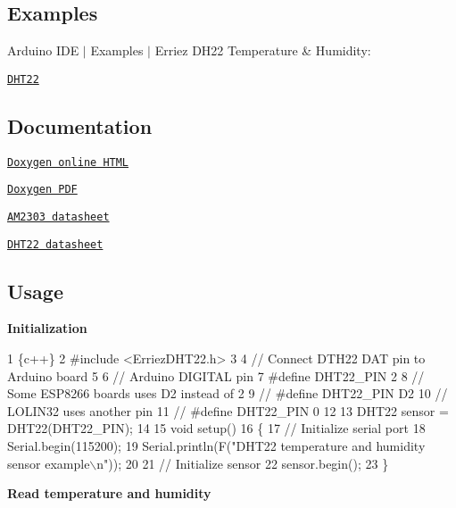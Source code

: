 \subsection*{Examples}

Arduino I\+DE $\vert$ Examples $\vert$ Erriez D\+H22 Temperature \& Humidity\+:


\begin{DoxyItemize}
\item \href{https://github.com/Erriez/ErriezDHT22/blob/master/examples/DHT22/DHT22.ino}{\tt D\+H\+T22}
\end{DoxyItemize}

\subsection*{Documentation}


\begin{DoxyItemize}
\item \href{https://erriez.github.io/ErriezDHT22}{\tt Doxygen online H\+T\+ML}
\item \href{https://github.com/Erriez/ErriezDHT22/raw/gh-pages/latex/ErriezDHT22.pdf}{\tt Doxygen P\+DF}
\item \href{https://raw.githubusercontent.com/Erriez/ErriezDHT22/master/extras/AM2303_datasheet.pdf}{\tt A\+M2303 datasheet}
\item \href{https://www.google.com/search?q=DHT22+datasheet}{\tt D\+H\+T22 datasheet}
\end{DoxyItemize}

\subsection*{Usage}

{\bfseries Initialization}


\begin{DoxyCode}
1 \{c++\}
2 #include <ErriezDHT22.h>
3 
4 // Connect DTH22 DAT pin to Arduino board
5 
6 // Arduino DIGITAL pin
7 #define DHT22\_PIN      2
8 // Some ESP8266 boards uses D2 instead of 2
9 // #define DHT22\_PIN   D2
10 // LOLIN32 uses another pin
11 // #define DHT22\_PIN   0
12 
13 DHT22 sensor = DHT22(DHT22\_PIN);
14 
15 void setup()
16 \{
17     // Initialize serial port
18     Serial.begin(115200);
19     Serial.println(F("DHT22 temperature and humidity sensor example\(\backslash\)n"));
20 
21     // Initialize sensor
22     sensor.begin();
23 \}
\end{DoxyCode}


{\bfseries Read temperature and humidity}


